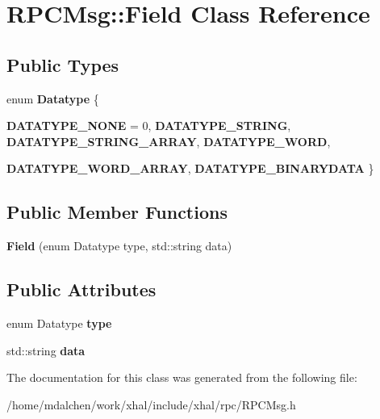 \hypertarget{classRPCMsg_1_1Field}{
\section{RPCMsg::Field Class Reference}
\label{classRPCMsg_1_1Field}
}
\subsection*{Public Types}
\begin{DoxyCompactItemize}
\item 
enum {\bfseries Datatype} \{ \par
{\bfseries DATATYPE\_\-NONE} =  0, 
{\bfseries DATATYPE\_\-STRING}, 
{\bfseries DATATYPE\_\-STRING\_\-ARRAY}, 
{\bfseries DATATYPE\_\-WORD}, 
\par
{\bfseries DATATYPE\_\-WORD\_\-ARRAY}, 
{\bfseries DATATYPE\_\-BINARYDATA}
 \}
\end{DoxyCompactItemize}
\subsection*{Public Member Functions}
\begin{DoxyCompactItemize}
\item 
\hypertarget{classRPCMsg_1_1Field_a8237227777200f8a361f845f80b0b3df}{
{\bfseries Field} (enum Datatype type, std::string data)}
\label{classRPCMsg_1_1Field_a8237227777200f8a361f845f80b0b3df}

\end{DoxyCompactItemize}
\subsection*{Public Attributes}
\begin{DoxyCompactItemize}
\item 
\hypertarget{classRPCMsg_1_1Field_a8178cdd36df3827240001db203be5540}{
enum Datatype {\bfseries type}}
\label{classRPCMsg_1_1Field_a8178cdd36df3827240001db203be5540}

\item 
\hypertarget{classRPCMsg_1_1Field_a6b845b7cd30511811c6320f97ea8d122}{
std::string {\bfseries data}}
\label{classRPCMsg_1_1Field_a6b845b7cd30511811c6320f97ea8d122}

\end{DoxyCompactItemize}


The documentation for this class was generated from the following file:\begin{DoxyCompactItemize}
\item 
/home/mdalchen/work/xhal/include/xhal/rpc/RPCMsg.h\end{DoxyCompactItemize}
